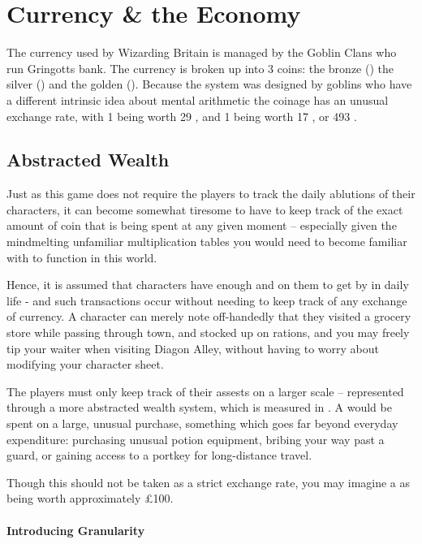 \chapter{Currency \& the Economy}

The currency used by Wizarding Britain is managed by the Goblin Clans who run Gringotts bank. The currency is broken up into 3 coins: the bronze  (\knut{})\comma{} the silver  (\sickle{}) and the golden  (\galleon{}). Because the system was designed by goblins \minus{} who have a different intrinsic idea about mental arithmetic \minus{} the coinage has an unusual exchange rate, with 1  being worth 29 , and 1  being worth 17 , or 493 . 


\section{Abstracted Wealth}

Just as this game does not require the players to track the daily ablutions of their characters, it can become somewhat tiresome to have to keep track of the exact amount of coin that is being spent at any given moment -- especially given the mindmelting unfamiliar multiplication tables you would need to become familiar with to function in this world. 

Hence, it is assumed that characters have enough  and  on them to get by in daily life - and such transactions occur without needing to keep track of any exchange of currency. A character can merely note off-handedly that they visited a grocery store while passing through town, and stocked up on rations, and you may freely tip your waiter when visiting Diagon Alley, without having to worry about modifying your character sheet.

The players must only keep track of their assests on a larger scale -- represented through a more abstracted wealth system, which is measured in . A  would be spent on a large, unusual purchase, something which goes far beyond everyday expenditure: purchasing unusual potion equipment, bribing your way past a guard, or gaining access to a portkey for long-distance travel. 

Though this should not be taken as a strict exchange rate, you may imagine a  as being worth approximately £100.

\subsubsection{Introducing Granularity}


